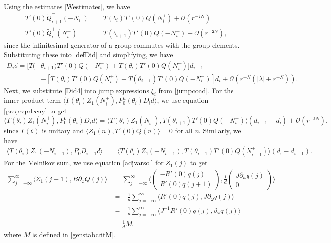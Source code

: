\documentclass[12pt]{elsarticle}
\begin{document}
Using the estimates \cref{Westimates}, we have
\begin{align*}
T'(0) \tilde{Q}_{i+1}^-(-N_i^-) &= T(\theta_i) T'(0) Q(N_i^+) + \mathcal{O}(r^{-2N}) \\
T'(0) \tilde{Q}_i^+(N_i^+) &= T(\theta_{i+1}) T'(0) Q(-N_i^-) + \mathcal{O}(r^{-2N}),
\end{align*}
since the infinitesimal generator of a group commutes with the group elements. Substituting these into \cref{defDid} and simplifying, we have
\begin{equation}\label{Did4}
\begin{aligned}
D_i d = [ T(&\theta_{i+1}) T'(0)Q(-N_i^-) + T(\theta_i) T'(0)Q(N_i^+) ] d_{i+1} \\
&- [ T(\theta_i) T'(0)Q(N_i^+) + T(\theta_{i+1}) T'(0)Q(-N_i^-) ] d_i 
+\mathcal{O}(r^{-N}( |\lambda| + r^{-N})).
\end{aligned}
\end{equation}
Next, we substitute \cref{Did4} into jump expressions $\xi_i$ from \cref{jumpcond}. For the inner product term $\langle T(\theta_i) Z_1(N_i^+), P_0^u(\theta_i) D_i d \rangle$, we use equation \cref{projexpdecay} to get
\begin{equation*}
\langle T(\theta_i) Z_1(N_i^+), P_0^u(\theta_i) D_i d \rangle 
= \langle T(\theta_i) Z_1(N_i^+), T(\theta_{i+1}) T'(0)Q(-N_i^-) \rangle (d_{i+1} - d_i)
+ \mathcal{O}(r^{-3N}).
\end{equation*}
since $T(\theta)$ is unitary and $\langle Z_1(n), T'(0)Q(n) \rangle = 0$ for all $n$. Similarly, we have
\begin{align*}
\langle T(\theta_i) Z_1(-N_{i-1}^-), P_0^s D_{i-1} d \rangle 
&= \langle T(\theta_i) Z_1(-N_{i-1}^-), T(\theta_{i-1}) T'(0)Q(N_{i-1}^+) \rangle (d_i - d_{i-1}).
\end{align*}
For the Melnikov sum, we use equation \eqref{adjvarsol} for $Z_1(j)$ to get
\begin{align*}
\sum_{j = -\infty}^{\infty} \langle Z_1(j+1), B  \partial_\omega Q(j) \rangle 
&= \sum_{j = -\infty}^{\infty} \langle \begin{pmatrix} -R'(0) q(j) \\ R'(0) q(j+1) \end{pmatrix}, \frac{1}{d} \begin{pmatrix} J \partial_\omega q(j) \\ 0 \end{pmatrix} \rangle \\
&= -\frac{1}{d} \sum_{j = -\infty}^{\infty} \langle R'(0) q(j), J \partial_\omega q(j) \rangle \\
&= -\frac{1}{d} \sum_{j = -\infty}^{\infty} \langle J^{-1} R'(0) q(j), \partial_\omega q(j) \rangle \\
&= \frac{1}{d}M,
\end{align*}
where $M$ is defined in \eqref{genstabcritM}.
\end{document}
